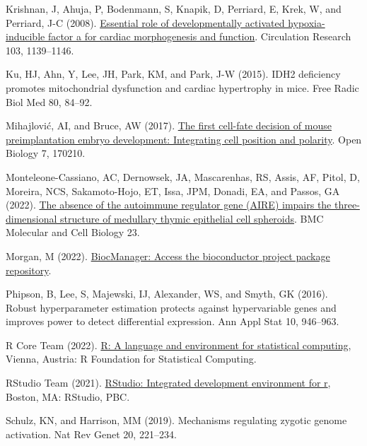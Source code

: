 \documentclass[
  parskip,
  oneside]{scrreprt}
\newlength{\cslhangindent}
\newlength{\cslentryspacingunit} %
\newenvironment{CSLReferences}[2] %
 {%
  \setlength{\parindent}{0pt}
  \ifodd #1
  \let\oldpar\par
  \def\par{\hangindent=\cslhangindent\oldpar}
  \fi
  \setlength{\parskip}{#2\cslentryspacingunit}
 }%
 {}
\begin{document}
\begin{CSLReferences}{0}{0}
\leavevmode{}%
Krishnan, J, Ahuja, P, Bodenmann, S, Knapik, D, Perriard, E, Krek, W,
and Perriard, J-C (2008).
\href{https://doi.org/10.1161/01.res.0000338613.89841.c1}{Essential role
of developmentally activated hypoxia-inducible factor a for cardiac
morphogenesis and function}. Circulation Research 103, 1139--1146.

\leavevmode{}%
Ku, HJ, Ahn, Y, Lee, JH, Park, KM, and Park, J-W (2015). {IDH2}
deficiency promotes mitochondrial dysfunction and cardiac hypertrophy in
mice. Free Radic Biol Med 80, 84--92.

\leavevmode{}%
Mihajlović, AI, and Bruce, AW (2017).
\href{https://doi.org/10.1098/rsob.170210}{The first cell-fate decision
of mouse preimplantation embryo development: Integrating cell position
and polarity}. Open Biology 7, 170210.

\leavevmode{}%
Monteleone-Cassiano, AC, Dernowsek, JA, Mascarenhas, RS, Assis, AF,
Pitol, D, Moreira, NCS, Sakamoto-Hojo, ET, Issa, JPM, Donadi, EA, and
Passos, GA (2022). \href{https://doi.org/10.1186/s12860-022-00414-9}{The
absence of the autoimmune regulator gene ({AIRE}) impairs the
three-dimensional structure of medullary thymic epithelial cell
spheroids}. {BMC} Molecular and Cell Biology 23.

\leavevmode{}%
Morgan, M (2022).
\href{https://CRAN.R-project.org/package=BiocManager}{BiocManager:
Access the bioconductor project package repository}.

\leavevmode{}%
Phipson, B, Lee, S, Majewski, IJ, Alexander, WS, and Smyth, GK (2016).
Robust hyperparameter estimation protects against hypervariable genes
and improves power to detect differential expression. Ann Appl Stat 10,
946--963.

\leavevmode{}%
R Core Team (2022). \href{https://www.R-project.org/}{R: A language and
environment for statistical computing}, Vienna, Austria: R Foundation
for Statistical Computing.

\leavevmode{}%
RStudio Team (2021). \href{http://www.rstudio.com/}{RStudio: Integrated
development environment for r}, Boston, MA: RStudio, PBC.

\leavevmode{}%
Schulz, KN, and Harrison, MM (2019). Mechanisms regulating zygotic
genome activation. Nat Rev Genet 20, 221--234.


\end{CSLReferences}
\end{document}
